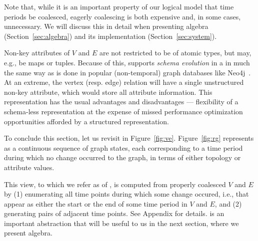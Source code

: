 Note that, while it is an important property of our logical model that
time periods be coalesced, eagerly coalescing is both expensive and,
in some cases, unnecessary.  We will discuss this in detail when
presenting \tg algebra (Section~\ref{sec:algebra}) and its
implementation (Section~\ref{sec:system}).

Non-key attributes of $V$ and $E$ are not restricted to be of atomic
types, but may, e.g., be maps or tuples.  Because of this, \ql
supports {\em schema evolution} in a \tg in much the same way as is
done in popular (non-temporal) graph databases like Neo4j~\cite{}.  At
an extreme, the vertex (resp. edge) relation will have a single
unstructured non-key attribute, which would store all attribute
information.  This representation has the usual advantages and
disadvantages --- flexibility of a schema-less representation at the
expense of missed performance optimization opportunities afforded by a
structured representation.

To conclude this section, let us revisit \tg {} in
Figure~\ref{fig:ve}.  Figure~\ref{fig:rg} represents  as a
continuous sequence of graph states, each corresponding to a time
period during which no change occurred to the graph, in terms of
either topology or attribute values.


This view, to which we refer as \rgs of , is computed from
properly coalesced $V$ and $E$ by (1) enumerating all time points
during which some change occured, i.e., that appear as either the
start or the end of some time period in $V$ and $E$, and (2)
generating pairs of adjacent time points. See Appendix for details.
\rgs is an important abstraction that will be useful to us in the next
section, where we present \tg algebra.

